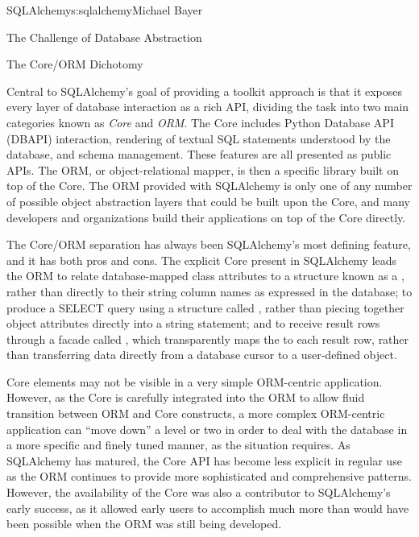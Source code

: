 \begin{aosachapter}{SQLAlchemy}{s:sqlalchemy}{Michael Bayer}
\begin{aosasect1}{The Challenge of Database Abstraction}
\end{aosasect1}

\begin{aosasect1}{The Core/ORM Dichotomy}

Central to SQLAlchemy's goal of providing a toolkit approach is that it
exposes every layer of database interaction as a rich API, dividing the task
into two main categories known as \emph{Core} and \emph{ORM}. The Core includes Python
Database API (DBAPI) interaction, rendering of textual SQL statements
understood by the database, and schema management.  These features are all
presented as public APIs. The ORM, or object-relational mapper, is then a specific
library built on top of the Core. The ORM provided with SQLAlchemy is only one
of any number of possible object abstraction layers that could be built upon
the Core, and many developers and organizations build their applications on top
of the Core directly.


The Core/ORM separation has always been SQLAlchemy's most defining feature,
and it has both pros and cons.   The explicit Core present in SQLAlchemy
leads the ORM to relate database-mapped class attributes to a
structure known as a , rather than directly to their string
column names as expressed in the database; to produce a SELECT query using a
structure called , rather than piecing together object attributes
directly into a string statement; and to receive result rows through a
facade called , which transparently maps the 
to each result row, rather than transferring data directly from a database cursor
to a user-defined object.

Core elements may not be visible in a very simple ORM-centric application.  However,
as the Core is carefully integrated into the ORM to allow fluid transition
between ORM and Core constructs, a more complex ORM-centric application
can ``move down'' a level or two in order to deal with the database in a more
specific and finely tuned manner, as the situation requires.  As SQLAlchemy has
matured, the Core API has become less explicit in regular use as the ORM
continues to provide more sophisticated and comprehensive patterns. However,
the availability of the Core was also a contributor to SQLAlchemy's early
success, as it allowed early users to accomplish much more than would have
been possible when the ORM was still being developed.


\end{aosasect1}
\end{aosachapter}
